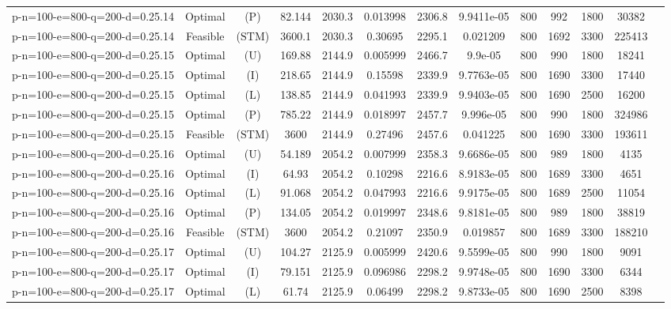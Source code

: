 \documentclass[landscape, a4paper]{article}
\newcommand{\STM}{\ensuremath{\mathrm{STM}}}
\newcommand{\Improved}{\ensuremath{\mathrm{I}}}
\newcommand{\Loose}{\ensuremath{\mathrm{L}}}
\newcommand{\Profit}{\ensuremath{\mathrm{P}}}
\newcommand{\Utility}{\ensuremath{\mathrm{U}}}
\begin{document}
\begin{center}
\begin{tabular}{lcccccccccccc}
p-n=100-e=800-q=200-d=0.25.14 & Optimal & (\Profit) & 82.144 & 2030.3 & 0.013998 & 2306.8 & 9.9411e-05 & 800 & 992 & 1800 & 30382 & \\
p-n=100-e=800-q=200-d=0.25.14 & Feasible & (\STM) & 3600.1 & 2030.3 & 0.30695 & 2295.1 & 0.021209 & 800 & 1692 & 3300 & 225413 & \\
p-n=100-e=800-q=200-d=0.25.15 & Optimal & (\Utility) & 169.88 & 2144.9 & 0.005999 & 2466.7 & 9.9e-05 & 800 & 990 & 1800 & 18241 & \\
p-n=100-e=800-q=200-d=0.25.15 & Optimal & (\Improved) & 218.65 & 2144.9 & 0.15598 & 2339.9 & 9.7763e-05 & 800 & 1690 & 3300 & 17440 & \\
p-n=100-e=800-q=200-d=0.25.15 & Optimal & (\Loose) & 138.85 & 2144.9 & 0.041993 & 2339.9 & 9.9403e-05 & 800 & 1690 & 2500 & 16200 & \\
p-n=100-e=800-q=200-d=0.25.15 & Optimal & (\Profit) & 785.22 & 2144.9 & 0.018997 & 2457.7 & 9.996e-05 & 800 & 990 & 1800 & 324986 & \\
p-n=100-e=800-q=200-d=0.25.15 & Feasible & (\STM) & 3600 & 2144.9 & 0.27496 & 2457.6 & 0.041225 & 800 & 1690 & 3300 & 193611 & \\
p-n=100-e=800-q=200-d=0.25.16 & Optimal & (\Utility) & 54.189 & 2054.2 & 0.007999 & 2358.3 & 9.6686e-05 & 800 & 989 & 1800 & 4135 & \\
p-n=100-e=800-q=200-d=0.25.16 & Optimal & (\Improved) & 64.93 & 2054.2 & 0.10298 & 2216.6 & 8.9183e-05 & 800 & 1689 & 3300 & 4651 & \\
p-n=100-e=800-q=200-d=0.25.16 & Optimal & (\Loose) & 91.068 & 2054.2 & 0.047993 & 2216.6 & 9.9175e-05 & 800 & 1689 & 2500 & 11054 & \\
p-n=100-e=800-q=200-d=0.25.16 & Optimal & (\Profit) & 134.05 & 2054.2 & 0.019997 & 2348.6 & 9.8181e-05 & 800 & 989 & 1800 & 38819 & \\
p-n=100-e=800-q=200-d=0.25.16 & Feasible & (\STM) & 3600 & 2054.2 & 0.21097 & 2350.9 & 0.019857 & 800 & 1689 & 3300 & 188210 & \\
p-n=100-e=800-q=200-d=0.25.17 & Optimal & (\Utility) & 104.27 & 2125.9 & 0.005999 & 2420.6 & 9.5599e-05 & 800 & 990 & 1800 & 9091 & \\
p-n=100-e=800-q=200-d=0.25.17 & Optimal & (\Improved) & 79.151 & 2125.9 & 0.096986 & 2298.2 & 9.9748e-05 & 800 & 1690 & 3300 & 6344 & \\
p-n=100-e=800-q=200-d=0.25.17 & Optimal & (\Loose) & 61.74 & 2125.9 & 0.06499 & 2298.2 & 9.8733e-05 & 800 & 1690 & 2500 & 8398 & \\

\end{tabular}
\end{center}
\end{document}
